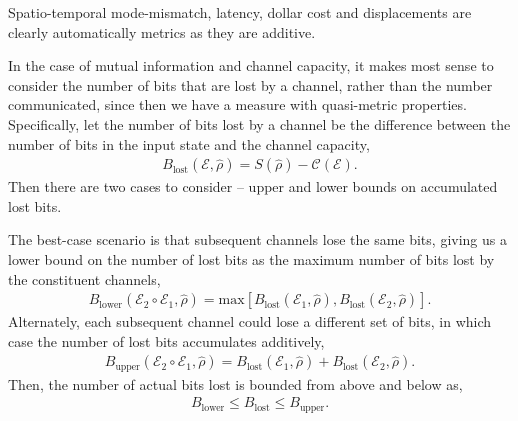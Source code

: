 \documentclass[aps, rmp, twocolumn, amsmath, amssymb, nofootinbib, superscriptaddress, longbibliography, floatfix, table-of-contents, eqsecnum]{revtex4-1}
\begin{document}
Spatio-temporal mode-mismatch, latency, dollar cost and displacements are clearly automatically metrics as they are additive.

In the case of mutual information and channel capacity, it makes most sense to consider the number of bits that are lost by a channel, rather than the number communicated, since then we have a measure with quasi-metric properties. Specifically, let the number of bits lost by a channel be the difference between the number of bits in the input state and the channel capacity,
\begin{align}
B_\text{lost}(\mathcal{E},\hat\rho) = S(\hat\rho) - \mathcal{C}(\mathcal{E}).
\end{align}
Then there are two cases to consider -- upper and lower bounds on accumulated lost bits.

The best-case scenario is that subsequent channels lose the same bits, giving us a lower bound on the number of lost bits as the maximum number of bits lost by the constituent channels,
\begin{align}
B_\text{lower}(\mathcal{E}_2\circ\mathcal{E}_1,\hat\rho) = \text{max}[B_\text{lost}(\mathcal{E}_1,\hat\rho), B_\text{lost}(\mathcal{E}_2,\hat\rho)].
\end{align}
Alternately, each subsequent channel could lose a different set of bits, in which case the number of lost bits accumulates additively,
\begin{align}
B_\text{upper}(\mathcal{E}_2\circ\mathcal{E}_1,\hat\rho) = B_\text{lost}(\mathcal{E}_1,\hat\rho) + B_\text{lost}(\mathcal{E}_2,\hat\rho). 
\end{align}
Then, the number of actual bits lost is bounded from above and below as,
\begin{align}
B_\text{lower} \leq B_\text{lost} \leq B_\text{upper}.	
\end{align}

\end{document}
